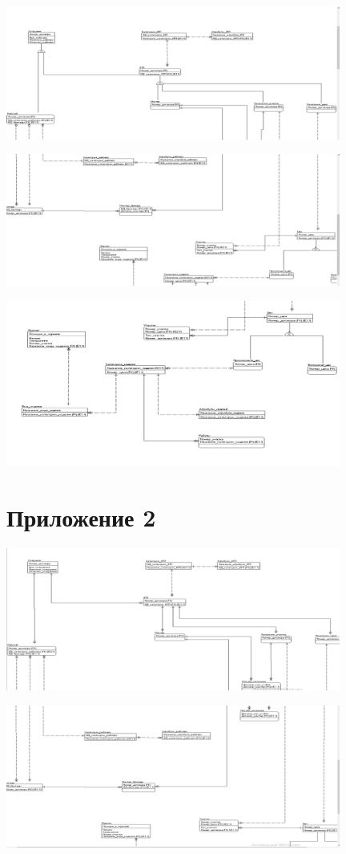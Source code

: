     \includegraphics[width=11cm]{./screenshots/model/model4.png}

    \includegraphics[width=11cm]{./screenshots/model/model5.png}

    \includegraphics[width=11cm]{./screenshots/model/model6.png}


\section{Приложение 2}

    \includegraphics[width=11cm]{./screenshots/model/model1.png}

    \includegraphics[width=11cm]{./screenshots/model/model2.png}

